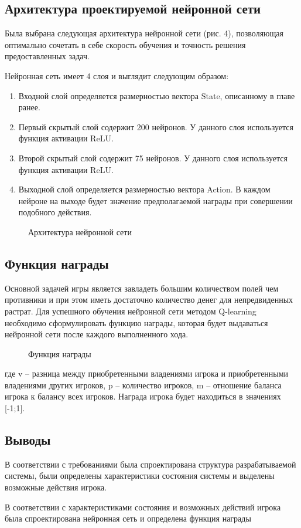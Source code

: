 \subsection{Архитектура проектируемой нейронной сети}
Была выбрана следующая архитектура нейронной сети (рис. 4), позволяющая оптимально сочетать в себе скорость обучения и точность решения предоставленных задач.

Нейронная сеть имеет 4 слоя и выглядит следующим образом:
\begin{spacing}{0.9}
\begin{enumerate}
    \item Входной слой определяется размерностью вектора State, описанному в главе ранее.
    \item Первый скрытый слой содержит 200 нейронов. У данного слоя используется функция активации ReLU.
    \item Второй скрытый слой содержит 75 нейронов. У данного слоя используется функция активации ReLU.
    \item Выходной слой определяется размерностью вектора Action. В каждом нейроне на выходе будет значение предполагаемой награды при совершении подобного действия.
\end{enumerate}
\end{spacing}
\begin{figure}[h]
    \caption{Архитектура нейронной сети}
\end{figure}
\subsection{Функция награды}
Основной задачей игры является завладеть большим количеством полей чем противники и при этом иметь достаточно количество денег для непредвиденных растрат. Для успешного обучения нейронной сети методом Q-learning необходимо сформулировать функцию награды, которая будет выдаваться нейронной сети после каждого выполненного хода. 
\begin{figure}[h!]
    \caption{Функция награды}
\end{figure}

где v – разница между приобретенными владениями игрока и приобретенными владениями других игроков, p – количество игроков, m – отношение баланса игрока к балансу всех игроков. Награда игрока будет находиться в значениях [-1;1].
\subsection*{Выводы}
В соответствии с требованиями была спроектирована структура разрабатываемой системы, были определены характеристики состояния системы и выделены возможные действия игрока. 

В соответствии с характеристиками состояния и возможных действий игрока была спроектирована нейронная сеть и определена функция награды 
